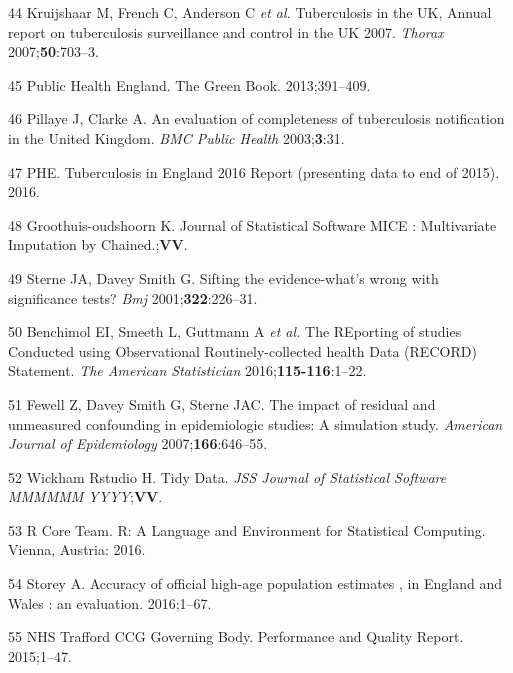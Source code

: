 \documentclass[11pt,twoside]{bristolthesis}
\begin{document}
  \leavevmode\hypertarget{ref-Kriujshaar2007}{}%
  44 Kruijshaar M, French C, Anderson C \emph{et al.} Tuberculosis in the UK, Annual report on tuberculosis surveillance and control in the UK 2007. \emph{Thorax} 2007;\textbf{50}:703--3.
  
  \leavevmode\hypertarget{ref-PublicHealthEngland2011a}{}%
  45 Public Health England. The Green Book. 2013;391--409.
  
  \leavevmode\hypertarget{ref-Pillaye2003}{}%
  46 Pillaye J, Clarke A. An evaluation of completeness of tuberculosis notification in the United Kingdom. \emph{BMC Public Health} 2003;\textbf{3}:31.
  
  \leavevmode\hypertarget{ref-PHE2016}{}%
  47 PHE. Tuberculosis in England 2016 Report (presenting data to end of 2015). 2016.
  
  \leavevmode\hypertarget{ref-Groothuis-oudshoorn}{}%
  48 Groothuis-oudshoorn K. Journal of Statistical Software MICE : Multivariate Imputation by Chained.;\textbf{VV}.
  
  \leavevmode\hypertarget{ref-Sterne2001}{}%
  49 Sterne JA, Davey Smith G. Sifting the evidence-what's wrong with significance tests? \emph{Bmj} 2001;\textbf{322}:226--31.
  
  \leavevmode\hypertarget{ref-Benchimol2016a}{}%
  50 Benchimol EI, Smeeth L, Guttmann A \emph{et al.} The REporting of studies Conducted using Observational Routinely-collected health Data (RECORD) Statement. \emph{The American Statistician} 2016;\textbf{115-116}:1--22.
  
  \leavevmode\hypertarget{ref-Fewell2007}{}%
  51 Fewell Z, Davey Smith G, Sterne JAC. The impact of residual and unmeasured confounding in epidemiologic studies: A simulation study. \emph{American Journal of Epidemiology} 2007;\textbf{166}:646--55.
  
  \leavevmode\hypertarget{ref-Wickham2015}{}%
  52 Wickham Rstudio H. Tidy Data. \emph{JSS Journal of Statistical Software MMMMMM YYYY};\textbf{VV}.
  
  \leavevmode\hypertarget{ref-R}{}%
  53 R Core Team. R: A Language and Environment for Statistical Computing. Vienna, Austria: 2016.
  
  \leavevmode\hypertarget{ref-storey2016}{}%
  54 Storey A. Accuracy of official high-age population estimates , in England and Wales : an evaluation. 2016;1--67.
  
  \leavevmode\hypertarget{ref-NHSTraffordCCGGoverningBody2015}{}%
  55 NHS Trafford CCG Governing Body. Performance and Quality Report. 2015;1--47.
  
\end{document}
